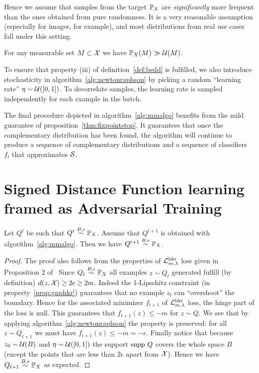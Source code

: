 Hence we assume that samples from the target $\mathbb{P}_X$ are \textit{significantly} more frequent than the ones obtained from pure randomness. It is a very reasonable assumption (especially for images, for example), and most distributions from real use cases fall under this setting.   

\begin{assumption}
For any measurable set $M\subset\mathcal{X}$ we have $\mathbb{P}_X(M)\gg \mathcal{U}(M)$.
\end{assumption}
  
To ensure that property (iii) of definition~\ref{def:bedd} is fulfilled, we also introduce stochasticity in algorithm~\ref{alg:newtonraphson} by picking a random ``learning rate'' $\eta\sim\mathcal{U}([0,1])$. To decorrelate samples, the learning rate is sampled independently for each example in the batch.  

The final procedure depicted in algorithm~\ref{alg:mmalgo} benefits from the mild guarantee of proposition~\ref{thm:fixpointstop}. It guarantees that once the complementary distribution has been found, the algorithm will continue to produce a sequence of complementary distributions and a sequence of classifiers $f_t$ that approximates $\mathcal{S}$.  

\section{Signed Distance Function learning framed as Adversarial Training}\label{app:sdfadv}

\begin{property}\label{thm:fixpointstop}
Let $Q^{t}$ be such that $Q^{t}\stackrel{B,\epsilon}{\sim}\mathbb{P}_X$. Assume that $Q^{t+1}$ is obtained with algorithm~\ref{alg:mmalgo}. Then we have $Q^{t+1}\stackrel{B,\epsilon}{\sim}\mathbb{P}_X$. 
\end{property}
\begin{proof}
The proof also follows from the properties of $\mathcal{L}^{\text{hkr}}_{m,\lambda}$ loss given in Proposition 2 of~\cite{serrurier2021achieving}
Since $Q_t\stackrel{B,\epsilon}{\sim}\mathbb{P}_X$ all examples $z\sim Q_t$ generated fulfill (by definition) $d(z,\mathcal{X})\geq 2\epsilon\geq 2m$. Indeed the 1-Lipschitz constraint (in property~\ref{prop:gnphkr}) guarantees that no example $z_t$ can ``overshoot'' the boundary. Hence for the associated minimizer $f_{t+1}$ of $\mathcal{L}^{\text{hkr}}_{m,\lambda}$ loss, the hinge part of the loss is null. This guarantees that $f_{t+1}(z)\leq -m$ for $z\sim Q$. We see that by applying algorithm~\ref{alg:newtonraphson} the property is preserved: for all $z\sim Q_{t+1}$ we must have $f_{t+1}(z)\leq -m=-\epsilon$. Finally notice that because $z_0\sim\mathcal{U}(B)$ and $\eta\sim\mathcal{U}([0,1])$ the support $\text{supp }Q$ covers the whole space $B$ (except the points that are less than $2\epsilon$ apart from $\mathcal{X}$). Hence we have $Q_{t+1}\stackrel{B,\epsilon}{\sim}\mathbb{P}_X$ as expected.
\end{proof}

